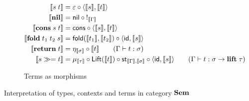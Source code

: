 \begin{figure}
\begin{subfigure}{\linewidth}
\begin{align*}
  \sem{\tmApp{s}{t}} &= \eval \comp \prodM{\sem{s}}{\sem{t}}
  \\
  \sem{\tmNil} &= \nil \comp {!_{\sem{\Gamma}}}
  \\
  \sem{\tmCons{s}{t}} &= \cons \comp \prodM{\sem{s}}{\sem{t}}
  \\
  \sem{\tmFoldList{t_1}{t_2}{s}} &= \fold(\sem{t_1},\sem{t_2}) \comp \prodM{\id}{\sem{s}}
  \\
  \sem{\tmReturn{t}} &= \eta_{\sem{\sigma}} \comp \sem{t}
  \tag*{($\Gamma \vdash t: \sigma$)}
  \\
  \sem{\tmBind{s}{t}} &= \mu_{\sem{\tau}} \comp \Lift(\sem{t}) \comp \mathsf{st}_{\sem{\Gamma},\sem{\sigma}} \comp \prodM{\id}{\sem{s}}
  \tag*{($\Gamma \vdash t: \sigma \to \tyLift\;\tau$)}
  \end{align*}
  \caption{Terms as morphisms}
  \label{fig:semantics:terms}
\end{subfigure}
\caption{Interpretation of types, contexts and terms in category $\mathbf{Sem}$}
\end{figure}
